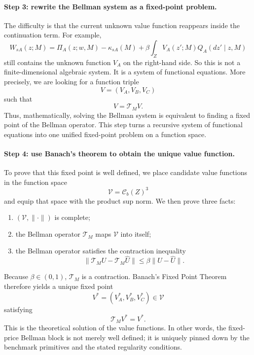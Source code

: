 \paragraph{Step 3: rewrite the Bellman system as a fixed-point problem.}
The difficulty is that the current unknown value function reappears inside the continuation term. For example,
\[
W_{sA}(z;M)
=
\Pi_A(z;w,M)-\kappa_{sA}(M)+\beta\int_Z V_A(z';M)Q_A(dz'\mid z,M)
\]
still contains the unknown function $V_A$ on the right-hand side. So this is not a finite-dimensional algebraic system. It is a system of functional equations. More precisely, we are looking for a function triple
\[
V=(V_A,V_B,V_C)
\]
such that
\[
V=\mathcal T_MV.
\]
Thus, mathematically, solving the Bellman system is equivalent to finding a fixed point of the Bellman operator. This step turns a recursive system of functional equations into one unified fixed-point problem on a function space.

\paragraph{Step 4: use Banach's theorem to obtain the unique value function.}
To prove that this fixed point is well defined, we place candidate value functions in the function space
\[
\mathcal V=\mathcal C_b(Z)^3
\]
and equip that space with the product sup norm. We then prove three facts:
\begin{enumerate}
    \item $(\mathcal V,\|\cdot\|)$ is complete;
    \item the Bellman operator $\mathcal T_M$ maps $\mathcal V$ into itself;
    \item the Bellman operator satisfies the contraction inequality
    \[
    \|\mathcal T_MU-\mathcal T_M\widehat U\|\le \beta\|U-\widehat U\|.
    \]
\end{enumerate}
Because $\beta\in(0,1)$, $\mathcal T_M$ is a contraction. Banach's Fixed Point Theorem therefore yields a unique fixed point
\[
V^*=(V_A^*,V_B^*,V_C^*)\in\mathcal V
\]
satisfying
\[
\mathcal T_MV^*=V^*.
\]
This is the theoretical solution of the value functions. In other words, the fixed-price Bellman block is not merely well defined; it is uniquely pinned down by the benchmark primitives and the stated regularity conditions.

